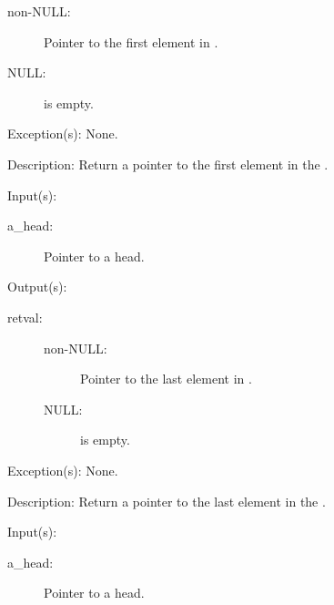 \begin{capi}
\begin{capilist}
\begin{description}
			\begin{description}\item[]
			\item[non-NULL: ]
				Pointer to the first element in .
			\item[NULL: ]
				 is empty.
			\end{description}
		\end{description}
	\item[Exception(s): ] None.
	\item[Description: ]
		Return a pointer to the first element in the .
	\end{capilist}
\label{ql_last}
	\begin{capilist}
	\item[Input(s): ]
		\begin{description}\item[]
		\item[a\_head: ]
			Pointer to a  head.
		\end{description}
	\item[Output(s): ]
		\begin{description}\item[]
		\item[retval: ]
			\begin{description}\item[]
			\item[non-NULL: ]
				Pointer to the last element in .
			\item[NULL: ]
				 is empty.
			\end{description}
		\end{description}
	\item[Exception(s): ] None.
	\item[Description: ]
		Return a pointer to the last element in the .
	\end{capilist}
\label{ql_next}
	\begin{capilist}
	\item[Input(s): ]
		\begin{description}\item[]
		\item[a\_head: ]
			Pointer to a \classname{ql} head.

\end{description}
\end{capilist}
\end{capi}
